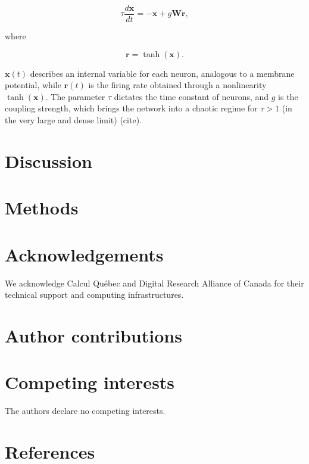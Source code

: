 \documentclass{article}
\begin{document}
\begin{multicols}{2}
$$\tau\frac{d\textbf{x}}{dt}=-\textbf{x} + g\textbf{W}\textbf{r},$$

where

$$\textbf{r}=\tanh{(\textbf{x})}.$$

$\textbf{x}(t)$ describes an internal variable for each neuron, analogous to a membrane potential, while $\textbf{r}(t)$ is the firing rate obtained through a nonlinearity $\tanh (\textbf{x})$. The parameter $\tau$ dictates the time constant of neurons, and $g$ is the coupling strength, which brings the network into a chaotic regime for $\tau>1$ (in the very large and dense limit) (cite).





\section*{Discussion}


\section*{Methods}


\newpage

%
%

\section*{Acknowledgements}

We acknowledge Calcul Québec and Digital Research Alliance of Canada for their technical support and computing infrastructures.

\section*{Author contributions}

\section*{Competing interests}

The authors declare no competing interests.

\end{multicols}

\newpage

\section*{References}
\end{document}
